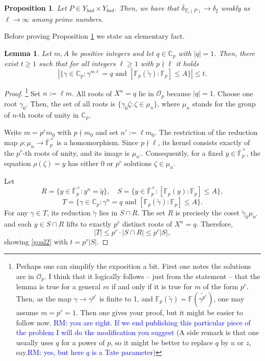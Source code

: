 \documentclass[a4paper,11pt]{amsart}
\newcommand{\Fp}{\mathbb{F}_p}
\newcommand{\ce}{\mathbb{C}}
\newcommand{\Oo}{\mathcal{O}}
\newtheorem{lema}[thm]{Lemma}
\newtheorem{prop}[thm]{Proposition}
\theoremstyle{definition}
\begin{document}
\begin{prop} \label{badlocus}
Let $P\in Y_{bad}\times Y_{bad}$. Then, we have that $\overline{\delta}_{T_\ell(P)} \rightarrow \delta_{\xi}$ weakly as $\ell \rightarrow \infty$ among prime numbers. 
\end{prop}

Before proving Proposition \ref{badlocus} we state an elementary fact. 

\begin{lema}\label{elementary}
Let $m,A$ be positive integers and let $q\in \ce_p$ with $|q|=1$. Then, there exist $t\geq 1$ such that for all integers $\ell\geq 1$ with $p\nmid \ell$ it holds
\begin{equation}\label{goal2}
|\{ \gamma \in \ce_p : \gamma^{m\ell}=q \textrm{ and } [\Fp(\tilde{\gamma}):\Fp]\leq A\}| \leq t.
\end{equation}
\end{lema}

\begin{proof}\footnote{Perhaps one can simplify the exposition a bit. First one notes the solutions are in $\Oo_p$. I think that it logically follows -- just from the statement -- that the lemma is true for a general $m$ if and only if it is true for $m$ of the form $p^r$. Then, as the map $\gamma \rightarrow \gamma^{p^r}$ is finite to 1, and $\mathbb{F}_p(\tilde \gamma) = \mathbb{F}(\widetilde{\gamma^{p^r}})$, one may assume $m=p^r=1$. Then one gives your proof, but it might be easier to follow now. \textcolor{blue}{RM: you are right. If we end publishing this particular piece of the problem I will do the modification you suggest} (A side remark is that one usually uses $q$ for a power of $p$, so it might be better to replace $q$ by $u$ or $z$, say.\textcolor{blue}{RM: yes, but here $q$ is a Tate parameter})}
Set $n:=\ell m$. All roots of $X^{n} = q$ lie in $\Oo_p$ because $|q|=1$. Choose one root $\gamma_0$. Then, the set of all roots is $\{\gamma_0\zeta : \zeta\in\mu_n\}$, where $\mu_n$ stands for the group of $n$-th roots of unity in $\ce_p$.

Write $m = p^r m_0$ with $p\nmid m_0$ and set $n' := \ell m_0$. The restriction of the reduction map $\rho:\mu_n \to \overline{\mathbb{F}}_p^\times$ is a homomorphism. Since $p\nmid \ell$, its kernel consists exactly of the $p^r$-th roots of unity, and its image is $\mu_{n'}$. Consequently, for a fixed $y\in\overline{\mathbb{F}}_p^\times$, the equation $\rho(\zeta)=y$ has either $0$ or $p^r$ solutions $\zeta\in\mu_n$.

Let
\[
R = \{y\in\overline{\mathbb{F}}_p^\times : y^n = \widetilde{q}\}, \quad S = \bigl\{ y\in\overline{\mathbb{F}}_p^\times : [\mathbb{F}_p(y):\mathbb{F}_p]\le A \bigr\},\]
\[ 
T=\{ \gamma \in \ce_p : \gamma^{n}=q \textrm{ and } [\Fp(\tilde{\gamma}):\Fp]\leq A\}.
\]
For any $\gamma \in T$, its reduction $\widetilde{\gamma}$ lies in $S\cap R$. The set $R$ is precisely the coset $\widetilde{\gamma}_0\mu_{n'}$ and each $y\in S\cap R$ lifts to exactly $p^r$ distinct roots  of $X^n=q$. Therefore, 
\[
|T|\leq p^r \cdot |S\cap R| \le p^r |S|, 
\]
showing \eqref{goal2} with  $t = p^r |S|$.
\end{proof}
\end{document}
